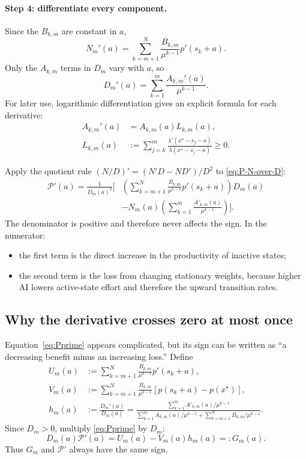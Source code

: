 \documentclass[11pt]{article}
\theoremstyle{tutorial}
\theoremstyle{remark}
\newcommand{\1}{\mathbb{I}}
\newcommand{\calP}{\mathcal{P}}
\begin{document}
\paragraph{Step 4: differentiate every component.}
Since the $B_{k,m}$ are constant in $a$,
\[
N_m'(a)=\sum_{k=m+1}^N
\frac{B_{k,m}}{\mu^{k-1}}p'(s_k+a).
\]
Only the $A_{k,m}$ terms in $D_m$ vary with $a$, so
\[
D_m'(a)=\sum_{k=1}^m\frac{A_{k,m}'(a)}{\mu^{k-1}}.
\]
For later use, logarithmic differentiation gives an explicit formula for each derivative:
\begin{align}
A_{k,m}'(a)
&=A_{k,m}(a)L_{k,m}(a),\nonumber\\
L_{k,m}(a)
&:=\sum_{j=k}^m
\frac{\lambda'(x^\star-s_j-a)}{\lambda(x^\star-s_j-a)}\ge0.
\label{eq:A-prime}
\end{align}

Apply the quotient rule $(N/D)'=(N'D-ND')/D^2$ to \eqref{eq:P-N-over-D}:
\begin{align}
\calP'(a)=\frac{1}{D_m(a)^2}\Bigg[&
\left(\sum_{k=m+1}^N\frac{B_{k,m}}{\mu^{k-1}}p'(s_k+a)\right)D_m(a)\nonumber\\
&-N_m(a)\left(\sum_{k=1}^m\frac{A'_{k,m}(a)}{\mu^{k-1}}\right)\Bigg].
\label{eq:Pprime}
\end{align}
The denominator is positive and therefore never affects the sign.  In the numerator:
\begin{itemize}
  \item the first term is the direct increase in the productivity of inactive states;
  \item the second term is the loss from changing stationary weights, because higher AI lowers active-state
  effort and therefore the upward transition rates.
\end{itemize}

\subsection{Why the derivative crosses zero at most once}

Equation~\eqref{eq:Pprime} appears complicated, but its sign can be written as ``a decreasing benefit minus
an increasing loss.''  Define
\begin{align*}
U_m(a)&:=\sum_{k=m+1}^N\frac{B_{k,m}}{\mu^{k-1}}p'(s_k+a),\\
V_m(a)&:=\sum_{k=m+1}^N\frac{B_{k,m}}{\mu^{k-1}}
[p(s_k+a)-p(x^\star)],\\
h_m(a)&:=\frac{D_m'(a)}{D_m(a)}
=\frac{\sum_{k=1}^m A'_{k,m}(a)/\mu^{k-1}}
{\sum_{k=1}^m A_{k,m}(a)/\mu^{k-1}
+\sum_{k=m+1}^N B_{k,m}/\mu^{k-1}}.
\end{align*}
Since $D_m>0$, multiply \eqref{eq:Pprime} by $D_m$:
\begin{equation}
  D_m(a)\calP'(a)=U_m(a)-V_m(a)h_m(a)=:G_m(a).
  \label{eq:G-sign}
\end{equation}
Thus $G_m$ and $\calP'$ always have the same sign.
\end{document}
